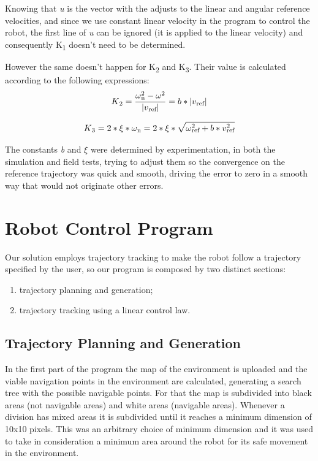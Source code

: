 \documentclass[11pt,a4paper]{scrartcl}
\def\SPSB#1#2{\rlap{\textsuperscript{#1}}\SB{#2}}
\def\SP#1{\textsuperscript{#1}}
\def\SB#1{\textsubscript{#1}}
\DeclarePairedDelimiter\abs{\lvert}{\rvert}
\begin{document}
Knowing that \textit{u} is the vector with the adjusts to the linear and angular reference velocities, and since we use constant linear velocity in the program to control the robot, the first line of \textit{u} can be ignored (it is applied to the linear velocity) and consequently K\SB{1} doesn't need to be determined.

However the same doesn't happen for K\SB{2} and K\SB{3}. Their value is calculated according to the following expressions:
	\[K\SB{2} = \frac{\omega\SPSB{2}{n} - \omega\SP{2}}{\abs{v\SB{ref}}} = b*\abs{v\SB{ref}}\]
    
    \[K\SB{3} = 2*\xi*\omega\SB{n} = 2*\xi*\sqrt{\omega\SPSB{2}{ref} + b*v\SPSB{2}{ref}}\]
    
The constants \textit{b} and \textit{$\xi$} were determined by experimentation, in both the simulation and field tests, trying to adjust them so the convergence on the reference trajectory was quick and smooth, driving the error to zero in a smooth way that would not originate other errors.

\section{Robot Control Program}
Our solution employs trajectory tracking to make the robot follow a trajectory specified by the user, so our program is composed by two distinct sections:
  \begin{enumerate}
      \item trajectory planning and generation;
      \item trajectory tracking using a linear control law.
  \end{enumerate}

\subsection{Trajectory Planning and Generation}
In the first part of the program the map of the environment is uploaded and the viable navigation points in the environment are calculated, generating a search tree with the possible navigable points. For that the map is subdivided into black areas (not navigable areas) and white areas (navigable areas). Whenever a division has mixed areas it is subdivided until it reaches a minimum dimension of 10x10 pixels. This was an arbitrary choice of minimum dimension and it was used to take in consideration a minimum area around the robot for its safe movement in the environment.
\end{document}
